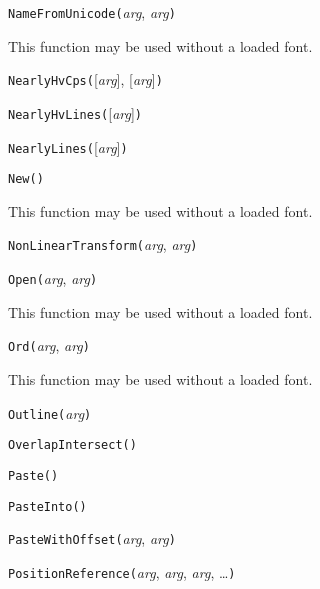 
\noindent\texttt{NameFromUnicode(}\textit{arg}, \textit{arg}\texttt{)}

This function may be used without a loaded font.


\noindent\texttt{NearlyHvCps(}[\textit{arg}], [\textit{arg}]\texttt{)}


\noindent\texttt{NearlyHvLines(}[\textit{arg}]\texttt{)}


\noindent\texttt{NearlyLines(}[\textit{arg}]\texttt{)}


\noindent\texttt{New(}\texttt{)}

This function may be used without a loaded font.


\noindent\texttt{NonLinearTransform(}\textit{arg}, \textit{arg}\texttt{)}


\noindent\texttt{Open(}\textit{arg}, \textit{arg}\texttt{)}

This function may be used without a loaded font.


\noindent\texttt{Ord(}\textit{arg}, \textit{arg}\texttt{)}

This function may be used without a loaded font.


\noindent\texttt{Outline(}\textit{arg}\texttt{)}


\noindent\texttt{OverlapIntersect(}\texttt{)}


\noindent\texttt{Paste(}\texttt{)}


\noindent\texttt{PasteInto(}\texttt{)}


\noindent\texttt{PasteWithOffset(}\textit{arg}, \textit{arg}\texttt{)}


\noindent\texttt{PositionReference(}\textit{arg}, \textit{arg}, \textit{arg}, \ldots\texttt{)}

